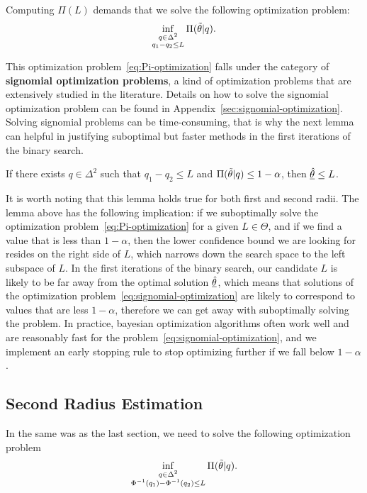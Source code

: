 Computing $\Pi(L)$ demands that we solve the following optimization problem:
\begin{equation}
    \inf_{\substack{q\in\Delta^{2}\\q_1-q_2\leq L}}\Pi(\Tilde{\theta}|q).\label{eq:Pi-optimization}
\end{equation}

This optimization problem~\eqref{eq:Pi-optimization} falls under the category of \textbf{signomial optimization problems}, a kind of optimization problems that are extensively studied in the literature.
Details on how to solve the signomial optimization problem can be found in Appendix~\ref{sec:signomial-optimization}.
Solving signomial problems can be time-consuming, that is why the next lemma can helpful in justifying suboptimal but faster methods in the first iterations of the binary search.
\begin{lemma}
    \label{lemma:suboptimal}
    If there exists $q\in\Delta^{2}$ such that $q_1-q_2\leq L$ and $\Pi(\Tilde{\theta}|q)\leq 1-\alpha$, then $\underline{\Hat{\theta}} \leq L$.
\end{lemma}

It is worth noting that this lemma holds true for both first and second radii.
The lemma above has the following implication: if we suboptimally solve the optimization problem~\eqref{eq:Pi-optimization} for a given $L\in\Theta$, and if we find a value that is less than $1-\alpha$, then the lower confidence bound we are looking for resides on the right side of $L$, which narrows down the search space to the left subspace of $L$.
In the first iterations of the binary search, our candidate $L$ is likely to be far away from the optimal solution $\underline{\Hat{\theta}}$, which means that solutions of the optimization problem~\eqref{eq:signomial-optimization} are likely to correspond to values that are less $1-\alpha$, therefore we can get away with suboptimally solving the problem.
In practice, bayesian optimization algorithms often work well and are reasonably fast for the problem~\eqref{eq:signomial-optimization}, and we implement an early stopping rule to stop optimizing further if we fall below $1-\alpha$.

\subsection{Second Radius Estimation}\label{subsec:second-radius-estimation}
In the same was as the last section, we need to solve the following optimization problem
\begin{equation}
    \inf_{\substack{q\in\Delta^{2}\\\Phi^{-1}(q_1)-\Phi^{-1}(q_2)\leq L}}\Pi(\Tilde{\theta}|q).\label{eq:non-signomial-optimization}
\end{equation}

